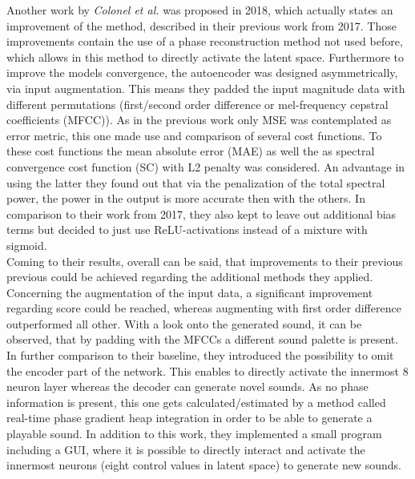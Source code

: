 Another work by \textit{Colonel et al.} was proposed in 2018, which actually states an improvement of the method, described in their previous work from 2017. \cite{colonel2018autoencoding} Those improvements contain the use of a phase reconstruction method not used before, which allows in this method to directly activate the latent space. Furthermore to improve the models convergence, the autoencoder was designed asymmetrically, via input augmentation. This means they padded the input magnitude data with different permutations (first/second order difference or mel-frequency cepstral coefficients (MFCC)). As in the previous work only MSE was contemplated as error metric, this one made use and comparison of several cost functions. To these cost functions the mean absolute error (MAE) as well the as spectral convergence cost function (SC) with L2 penalty was considered. An advantage in using the latter they found out that via the penalization of the total spectral power, the power in the output is more accurate then with the others. In comparison to their work from 2017, they also kept to leave out additional bias terms but decided to just use ReLU-activations instead of a mixture with sigmoid.\\
Coming to their results, overall can be said, that improvements to their previous previous could be achieved regarding the additional methods they applied. Concerning the augmentation of the input data, a significant improvement regarding score could be reached, whereas augmenting with first order difference outperformed all other. With a look onto the generated sound, it can be observed, that by padding with the MFCCs a different sound palette is present. In further comparison to their baseline, they introduced the possibility to omit the encoder part of the network. This enables to directly activate the innermost 8 neuron layer whereas the decoder can generate novel sounds. As no phase information is present, this one gets calculated/estimated by a method called real-time phase gradient heap integration in order to be able to generate a playable sound. In addition to this work, they implemented a small program including a GUI, where it is possible to directly interact and activate the innermost neurons (eight control values in latent space) to generate new sounds.\\

